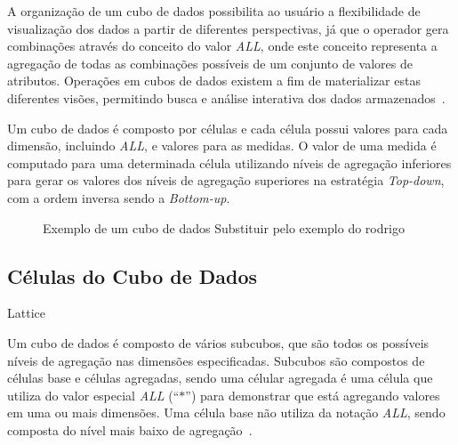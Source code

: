 A organização de um cubo de dados possibilita ao usuário a flexibilidade de visualização dos dados a partir de diferentes perspectivas, já que o operador gera combinações através do conceito do valor \textit{ALL}, onde este conceito representa a agregação de todas as combinações possíveis de um conjunto de valores de atributos.
Operações em cubos de dados existem a fim de materializar estas diferentes visões, permitindo busca e análise interativa dos dados armazenados~\cite{hanDataMiningConcepts2011}.

Um cubo de dados é composto por células e cada célula possui valores para cada dimensão, incluindo \textit{ALL}, e valores para as medidas.
O valor de uma medida é computado para uma determinada célula utilizando níveis de agregação inferiores para gerar os valores dos níveis de agregação superiores na estratégia \textit{Top-down}, com a ordem inversa sendo a \textit{Bottom-up}.

\begin{figure}[!htb]
	\caption{Exemplo de um cubo de dados \color{red}Substituir pelo exemplo do rodrigo}\label{fig:cubeexample}
	\vspace{2mm}
	\begin{center}
	\end{center}
	\vspace{1mm}
	\legenda{}
\end{figure}

\subsection{Células do Cubo de Dados}\label{ch:fun:cube:cells}

{\color{red} Lattice}

Um cubo de dados é composto de vários subcubos, que são todos os possíveis níveis de agregação nas dimensões especificadas.
Subcubos são compostos de células base e células agregadas, sendo uma célular agregada é uma célula que utiliza do valor especial \textit{ALL} (``$*$'') para demonstrar que está agregando valores em uma ou mais dimensões.
Uma célula base não utiliza da notação \textit{ALL}, sendo composta do nível mais baixo de agregação~\cite{limaSEQUENTIALPARALLELAPPROACHES2009}.

